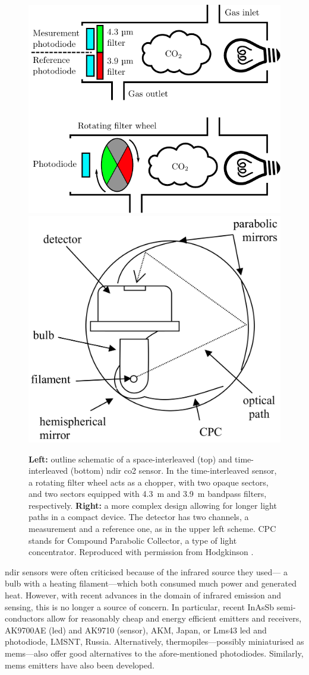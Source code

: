 \begin{figure}
	\centering
	\includegraphics[valign=c,width=.55\linewidth]{1_main_matter/choos_figures/review/ndir_outline_converted}
	\includegraphics[valign=c,width=.44\linewidth]{1_main_matter/choos_figures/review/ndir_long_path}
	\caption[\gls{ndir} sensors outlines.]{\textbf{Left:} outline schematic of a space-interleaved (top) and time-interleaved (bottom) \gls{ndir} \gls{co2} sensor. In the time-interleaved sensor, a rotating filter wheel acts as a chopper, with two opaque sectors, and two sectors equipped with 4.3~\textmu{}m and 3.9~\textmu{}m bandpass filters, respectively. \textbf{Right:} a more complex design allowing for longer light paths in a compact device. The detector has two channels, a measurement and a reference one, as in the upper left scheme. CPC stands for Compound Parabolic Collector, a type of light concentrator. Reproduced with permission from Hodgkinson \etal{}\cite{hodgkinson2013}.}
	\label{fig:choos:review:ndir_sensor_scheme}
\end{figure}

\gls{ndir} sensors were often criticised because of the infrared source they used---{\ie} a bulb with a heating filament---which both consumed much power and generated heat\cite{gibson2013}. However, with recent advances in the domain of infrared emission and sensing, this is no longer a source of concern. In particular, recent InAsSb semi-conductors allow for reasonably cheap and energy efficient emitters and receivers, {\eg} AK9700AE (\gls{led}) and AK9710 (sensor), AKM, Japan, or Lms43 \gls{led} and photodiode, LMSNT, Russia. Alternatively, thermopiles---possibly miniaturised as \gls{mems}---also offer good alternatives to the afore-mentioned photodiodes\cite{xu2017}. Similarly, \gls{mems} emitters have also been developed\cite{lee2009, liu2016}.

